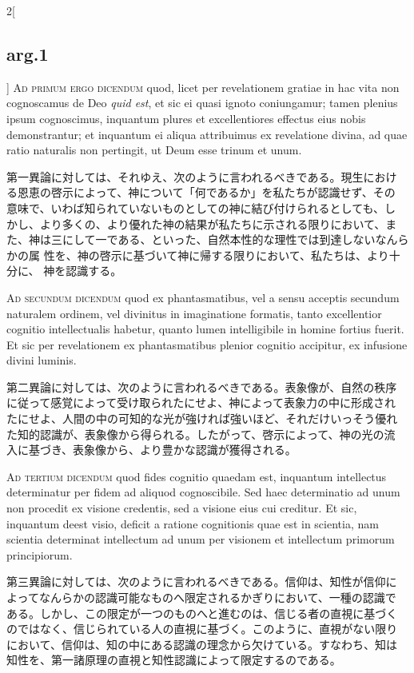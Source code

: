 \documentclass[paper=a4paper,fontsize=10pt,jafontsize=9pt,titlepage]{jlreq}
\begin{document}
\begin{paracol}{2}[\subsection{arg.1}]
{\scshape Ad primum ergo dicendum} quod, licet per revelationem gratiae in
hac vita non cognoscamus de Deo {\itshape quid est}, et sic ei quasi ignoto
coniungamur; tamen plenius ipsum cognoscimus, inquantum plures et
excellentiores effectus eius nobis demonstrantur; et inquantum ei
aliqua attribuimus ex revelatione divina, ad quae ratio naturalis non
pertingit, ut Deum esse trinum et unum.

\switchcolumn

第一異論に対しては、それゆえ、次のように言われるべきである。現生におけ
る恩恵の啓示によって、神について「何であるか」を私たちが認識せず、その
意味で、いわば知られていないものとしての神に結び付けられるとしても、し
かし、より多くの、より優れた神の結果が私たちに示される限りにおいて、ま
た、神は三にして一である、といった、自然本性的な理性では到達しないなんらかの属
性を、神の啓示に基づいて神に帰する限りにおいて、私たちは、より十分に、
神を認識する。

\switchcolumn*[\subsection{ad.2}]

{\scshape Ad secundum dicendum} quod ex phantasmatibus, vel a sensu
acceptis secundum naturalem ordinem, vel divinitus in imaginatione
formatis, tanto excellentior cognitio intellectualis habetur, quanto
lumen intelligibile in homine fortius fuerit. Et sic per revelationem
ex phantasmatibus plenior cognitio accipitur, ex infusione divini
luminis.

\switchcolumn

第二異論に対しては、次のように言われるべきである。表象像が、自然の秩序
に従って感覚によって受け取られたにせよ、神によって表象力の中に形成され
たにせよ、人間の中の可知的な光が強ければ強いほど、それだけいっそう優れ
た知的認識が、表象像から得られる。したがって、啓示によって、神の光の流
入に基づき、表象像から、より豊かな認識が獲得される。

\switchcolumn*[\subsection{ad.3}]

{\scshape Ad tertium dicendum} quod fides cognitio quaedam est, inquantum
intellectus determinatur per fidem ad aliquod cognoscibile. Sed haec
determinatio ad unum non procedit ex visione credentis, sed a visione
eius cui creditur. Et sic, inquantum deest visio, deficit a ratione
cognitionis quae est in scientia, nam scientia determinat intellectum
ad unum per visionem et intellectum primorum principiorum.

\switchcolumn

第三異論に対しては、次のように言われるべきである。信仰は、知性が信仰に
よってなんらかの認識可能なものへ限定されるかぎりにおいて、一種の認識で
ある。しかし、この限定が一つのものへと進むのは、信じる者の直視に基づく
のではなく、信じられている人の直視に基づく。このように、直視がない限り
において、信仰は、知の中にある認識の理念から欠けている。すなわち、知は
知性を、第一諸原理の直視と知性認識によって限定するのである。

\end{paracol}
\end{document}
